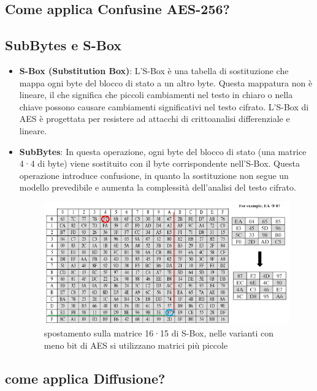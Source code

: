 \documentclass[a4paper,12pt]{report}
\begin{document}
				\subsection{Come applica Confusine AES-256? }
				\subsection*{SubBytes e S-Box}

				\begin{itemize}
					\item \textbf{S-Box (Substitution Box)}: L'S-Box è una tabella
					di sostituzione che mappa ogni byte del blocco di stato a un
					altro byte. Questa mappatura non è lineare, il che significa che
					piccoli cambiamenti nel testo in chiaro o nella chiave possono
					causare cambiamenti significativi nel testo cifrato. L'S-Box di
					AES è progettata per resistere ad attacchi di crittoanalisi
					differenziale e lineare.
					\item \textbf{SubBytes}: In questa operazione, ogni byte del
					blocco di stato (una matrice 4·4 di byte) viene sostituito con
					il byte corrispondente nell'S-Box. Questa operazione introduce
					confusione, in quanto la sostituzione non segue un modello
					prevedibile e aumenta la complessità dell'analisi del testo
					cifrato.
					\begin{figure}[H]
						\centering
						\includegraphics[width=1.1\textwidth]{sbox.png}
						\caption{spostamento sulla matrice 16·15 di S-Box, nelle varianti con meno bit di AES si utilizzano matrici più piccole}
					\end{figure}
					
				\end{itemize}
				\newpage
				\subsection{come applica Diffusione?}
\end{document}
